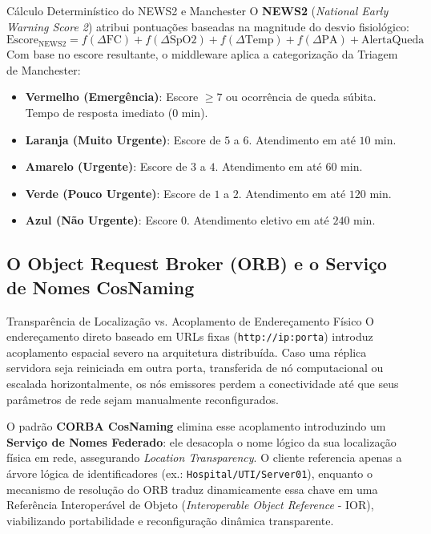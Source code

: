 \documentclass[11pt,a4paper]{article}
\begin{document}
\begin{conceito}{Cálculo Determinístico do NEWS2 e Manchester}
O \textbf{NEWS2} (\textit{National Early Warning Score 2}) atribui pontuações baseadas na magnitude do desvio fisiológico:
\begin{equation}
\text{Escore}_{\text{NEWS2}} = f(\Delta \text{FC}) + f(\Delta \text{SpO2}) + f(\Delta \text{Temp}) + f(\Delta \text{PA}) + \text{AlertaQueda}
\end{equation}
Com base no escore resultante, o middleware aplica a categorização da Triagem de Manchester:
\begin{itemize}
    \item \textbf{Vermelho (Emergência)}: Escore $\ge 7$ ou ocorrência de queda súbita. Tempo de resposta imediato ($0\text{ min}$).
    \item \textbf{Laranja (Muito Urgente)}: Escore de $5$ a $6$. Atendimento em até $10\text{ min}$.
    \item \textbf{Amarelo (Urgente)}: Escore de $3$ a $4$. Atendimento em até $60\text{ min}$.
    \item \textbf{Verde (Pouco Urgente)}: Escore de $1$ a $2$. Atendimento em até $120\text{ min}$.
    \item \textbf{Azul (Não Urgente)}: Escore $0$. Atendimento eletivo em até $240\text{ min}$.
\end{itemize}
\end{conceito}

\subsection{O Object Request Broker (ORB) e o Serviço de Nomes CosNaming}

\begin{fundamento}{Transparência de Localização vs. Acoplamento de Endereçamento Físico}
O endereçamento direto baseado em URLs fixas (\texttt{http://ip:porta}) introduz acoplamento espacial severo na arquitetura distribuída. Caso uma réplica servidora seja reiniciada em outra porta, transferida de nó computacional ou escalada horizontalmente, os nós emissores perdem a conectividade até que seus parâmetros de rede sejam manualmente reconfigurados.

O padrão \textbf{CORBA CosNaming} elimina esse acoplamento introduzindo um \textbf{Serviço de Nomes Federado}: ele desacopla o nome lógico da sua localização física em rede, assegurando \textit{Location Transparency}. O cliente referencia apenas a árvore lógica de identificadores (ex.: \texttt{Hospital/UTI/Server01}), enquanto o mecanismo de resolução do ORB traduz dinamicamente essa chave em uma Referência Interoperável de Objeto (\textit{Interoperable Object Reference} - IOR), viabilizando portabilidade e reconfiguração dinâmica transparente.
\end{fundamento}
\end{document}
